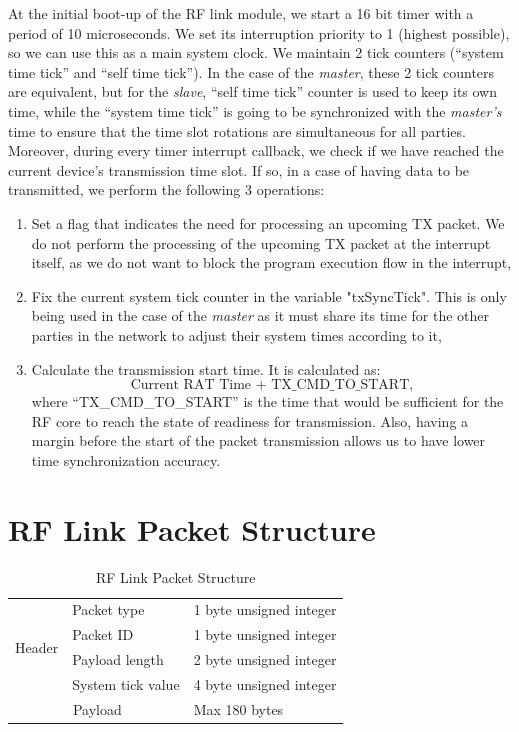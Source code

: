 At the initial boot-up of the RF link module, we start a 16 bit timer with a period of 10 microseconds. We set its interruption priority to 1 (highest possible), so we can use this as a main system clock. 
We maintain 2 tick counters (“system time tick” and “self time tick”). In the case of the \emph{master}, these 2 tick counters are equivalent, but for the \emph{slave}, “self time tick” counter is used to keep its own time, while the “system time tick” is going to be synchronized with the \emph{master’s} time to ensure that the time slot rotations are simultaneous for all parties. Moreover, during every timer interrupt callback, we check if we have reached the current device’s transmission time slot. If so, in a case of having data to be transmitted, we perform the following 3 operations:
\begin{enumerate}[nolistsep]
    \item Set a flag that indicates the need for processing an upcoming TX packet. We do not perform the processing of the upcoming TX packet at the interrupt itself, as we do not want to block the program execution flow in the interrupt,
    \item Fix the current system tick counter in the variable "txSyncTick". This is only being used in the case of the \emph{master} as it must share its time for the other parties in the network to adjust their system times according to it,
    \item Calculate the transmission start time. It is calculated as: \[ \text{Current\ RAT\ Time + TX\_CMD\_TO\_START,} \] where “TX\_CMD\_TO\_START” is the time that would be sufficient for the RF core to reach the state of readiness for transmission. Also, having a margin before the start of the packet transmission allows us to have lower time synchronization accuracy.
\end{enumerate}

\section{RF Link Packet Structure}


\begin{table}
\centering
\caption{RF Link Packet Structure}
\label{rf-link-pkt-struct}
\begin{tabular}{|p{1in}|p{1.5in}|p{2in}|} \hline 
\multirow{4}{*}{Header} & Packet type & {1 byte unsigned integer} \\ \cline{2-3}
 & Packet ID & 1 byte unsigned integer \\ \cline{2-3}
 & Payload length & 2 byte unsigned integer \\ \cline{2-3}
 & System tick value & 4 byte unsigned integer \\ \cline{2-3} \hline
 \multicolumn{2}{|c|}{Payload} & Max 180 bytes \\ \hline
\end{tabular}
\end{table}

